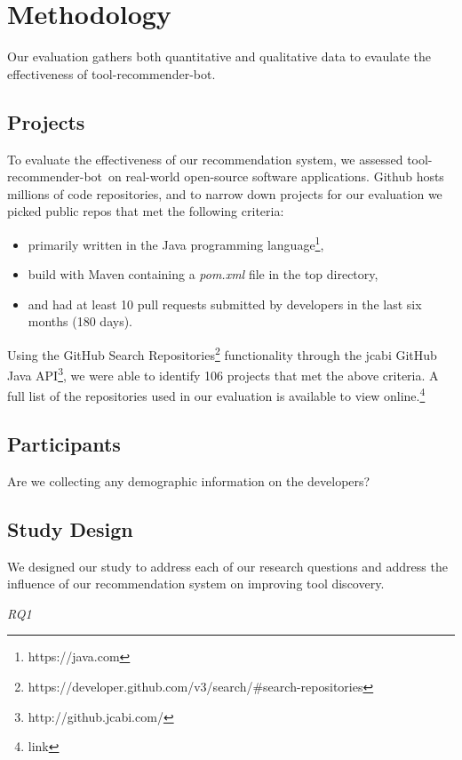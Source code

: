 \documentclass[conference]{IEEEtran}
\newcommand{\tool}{tool-recommender-bot}
\newcommand{\pseudosubsection}[1]{\vspace{2mm} {\it #1}}
\begin{document}
\section{Methodology}

Our evaluation gathers both quantitative and qualitative data to evaulate the effectiveness of \tool.

\subsection{Projects}

To evaluate the effectiveness of our recommendation system, we assessed \tool~on real-world open-source software applications. Github hosts millions of code repositories, and to narrow down projects for our evaluation we picked public repos that met the following criteria:

\begin{itemize}
\item primarily written in the Java programming language\footnote{https://java.com},
\item build with Maven containing a \textit{pom.xml} file in the top directory,
\item and had at least 10 pull requests submitted by developers in the last six months (180 days).
\end{itemize}

Using the GitHub Search Repositories\footnote{https://developer.github.com/v3/search/\#search-repositories} functionality through the jcabi GitHub Java API\footnote{http://github.jcabi.com/}, we were able to identify 106 projects that met the above criteria. A full list of the repositories used in our evaluation is available to view online.\footnote{link}
\subsection{Participants}

Are we collecting any demographic information on the developers?

\subsection{Study Design}

We designed our study to address each of our research questions and address the influence of our recommendation system on improving tool discovery.

\pseudosubsection{RQ1}
\end{document}
